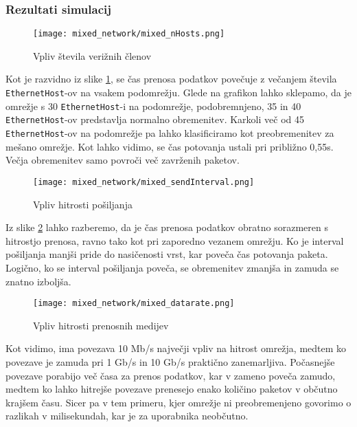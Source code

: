 \subsubsection{Rezultati simulacij}

\begin{figure}[H]
    \centering
    \texttt{[image: mixed\_network/mixed\_nHosts.png]}
    \caption{Vpliv števila verižnih členov}
    \label{g05:fig:mixed-nHosts}
\end{figure}

Kot je razvidno iz slike \ref{g05:fig:mixed-nHosts}, se čas prenosa podatkov povečuje z večanjem števila \texttt{EthernetHost}-ov na vsakem podomrežju.
Glede na grafikon lahko sklepamo, da je omrežje s 30 \texttt{EthernetHost}-i na podomrežje, podobremnjeno, 35 in 40 \texttt{EthernetHost}-ov predstavlja normalno obremenitev. Karkoli več od 45 \texttt{EthernetHost}-ov na podomrežje pa lahko klasificiramo kot preobremenitev za mešano omrežje. Kot lahko vidimo, se čas potovanja ustali pri približno 0,55s. Večja obremenitev samo povroči več zavrženih paketov.

\begin{figure}[H]
    \centering
    \texttt{[image: mixed\_network/mixed\_sendInterval.png]}
    \caption{Vpliv hitrosti pošiljanja}
    \label{g05:fig:mixed-sendInterval}
\end{figure}

Iz slike \ref{g05:fig:mixed-sendInterval} lahko razberemo, da je čas prenosa podatkov obratno sorazmeren s hitrostjo prenosa, ravno tako kot pri zaporedno vezanem omrežju. Ko je interval pošiljanja manjši pride do nasičenosti vrst, kar poveča čas potovanja paketa. Logično, ko se interval pošiljanja poveča, se obremenitev zmanjša in zamuda se znatno izboljša.

\begin{figure}[H]
    \centering
    \texttt{[image: mixed\_network/mixed\_datarate.png]}
    \caption{Vpliv hitrosti prenosnih medijev}
    \label{g05:fig:mixed-datarate}
\end{figure}

Kot vidimo, ima povezava 10 Mb/s največji vpliv na hitrost omrežja, medtem ko povezave je zamuda pri 1 Gb/s in 10 Gb/s praktično zanemarljiva. Počasnejše povezave porabijo več časa za prenos podatkov, kar v zameno poveča zamudo, medtem ko lahko hitrejše povezave prenesejo enako količino paketov v občutno krajšem času. Sicer pa v tem primeru, kjer omrežje ni preobremenjeno govorimo o razlikah v milisekundah, kar je za uporabnika neobčutno.

